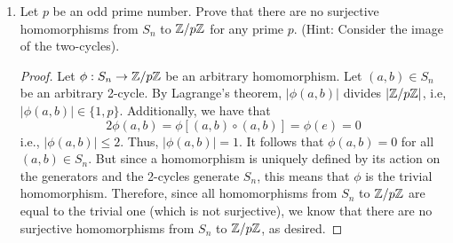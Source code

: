 \documentclass[../psets.tex]{subfiles}
\begin{document}
\begin{enumerate}
\begin{enumerate}
\begin{enumerate}
\begin{proof}
            \end{proof}
            \item $\Aut(K)\cong\Out(K)\cong S_3$, where $K=(\Z/2\Z)^2$ is the Klein 4-group.
            \begin{proof}
                $K$ is abelian; hence, by part (h), $\Aut(K)\cong\Out(K)$.\par
                $K=\gen{(0,1),(1,0)}$; hence, any $\phi\in\Aut(K)$ is uniquely defined by its action on $(0,1)$ and $(1,0)$. In particular, since $\phi$ is a homomorphism, we know $\phi(0,0)=(0,0)$. Additionally, whichever element of $\{(0,1),(1,0),(1,1)\}$ is not in $\phi(\{(0,1),(1,0)\})$ is the element to which $\phi$ maps $(1,1)$. Thus, we can define an isomorphism from $\psi:\Aut(G)\to S_3$ as follows. Let $f:K\setminus\{(0,0)\}\to[3]$ be defined by
                \begin{align*}
                    (0,1) &\mapsto 1&
                    (1,0) &\mapsto 2&
                    (1,1) &\mapsto 3
                \end{align*}
                Then define $\psi$ by
                \begin{equation*}
                    \psi(\phi) = f\circ\phi\circ f^{-1}
                \end{equation*}
                It follows by an analogous argument to that used in part (d) that $\psi$ is an isomorphism.
            \end{proof}
        \end{enumerate}
    \end{enumerate}
    \item Let $p$ be an odd prime number. Prove that there are no surjective homomorphisms from $S_n$ to $\mathbb{Z}/p\mathbb{Z}$ for any prime $p$. (Hint: Consider the image of the two-cycles).
    \begin{proof}
        Let $\phi:S_n\to\mathbb{Z}/p\mathbb{Z}$ be an arbitrary homomorphism. Let $(a,b)\in S_n$ be an arbitrary 2-cycle. By Lagrange's theorem, $|\phi(a,b)|$ divides $|\mathbb{Z}/p\mathbb{Z}|$, i.e, $|\phi(a,b)|\in\{1,p\}$. Additionally, we have that
        \begin{equation*}
            2\phi(a,b) = \phi[(a,b)\circ(a,b)] = \phi(e) = 0
        \end{equation*}
        i.e., $|\phi(a,b)|\leq 2$. Thus, $|\phi(a,b)|=1$. It follows that $\phi(a,b)=0$ for all $(a,b)\in S_n$. But since a homomorphism is uniquely defined by its action on the generators and the 2-cycles generate $S_n$, this means that $\phi$ is the trivial homomorphism. Therefore, since all homomorphisms from $S_n$ to $\mathbb{Z}/p\mathbb{Z}$ are equal to the trivial one (which is not surjective), we know that there are no surjective homomorphisms from $S_n$ to $\mathbb{Z}/p\mathbb{Z}$, as desired.
    \end{proof}
\end{enumerate}
\end{document}
